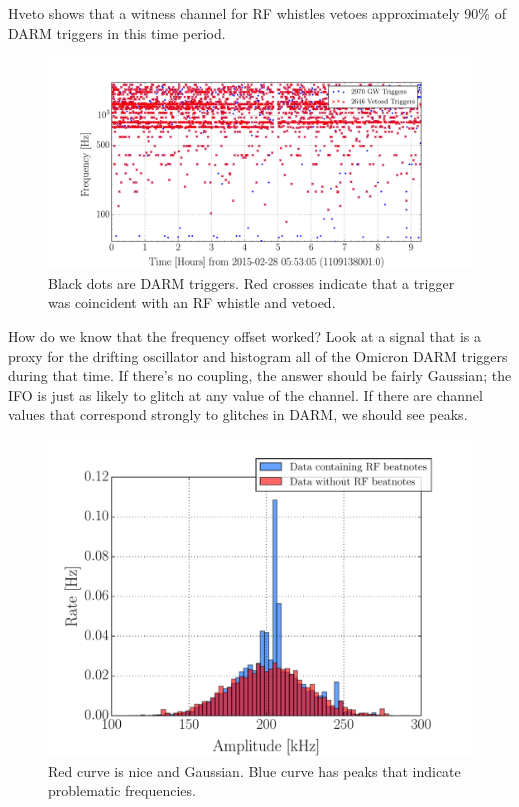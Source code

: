 Hveto shows that a witness channel for RF whistles vetoes approximately 90\% 
of DARM triggers in this time period.

\begin{figure}[ht!]%
\includegraphics[width=\textwidth]{figures/detchar/Hveto_whistles_time_frequency}
\caption{Black dots are DARM triggers. Red crosses indicate that a trigger was %
         coincident with an RF whistle and vetoed.}
\end{figure}\label{fig:hveto-whistles}

How do we know that the frequency offset worked? Look at a signal that is a proxy 
for the drifting oscillator and histogram all of the Omicron DARM triggers during 
that time. If there's no coupling, the answer should be fairly Gaussian; the 
IFO is just as likely to glitch at any value of the channel. If there are 
channel values that correspond strongly to glitches in DARM, we should see peaks.

\begin{figure}[ht!]%
\includegraphics[width=\textwidth]{figures/detchar/Rate_Histogram_Whistles_LLO}
\caption[DARM glitch histograms with and without RF whistles]{Red curve is nice %
         and Gaussian. Blue curve has peaks that indicate problematic frequencies.}
\end{figure}\label{fig:darm-whistle-hist}

